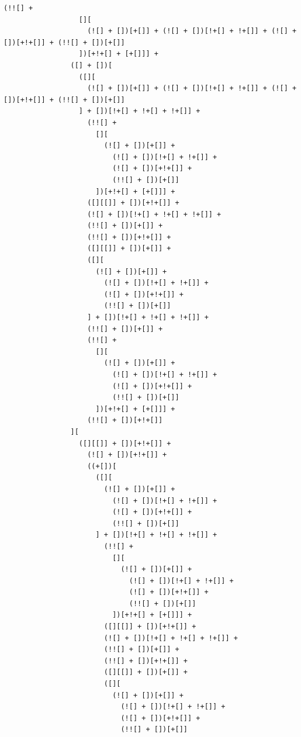 \documentclass[10pt,twocolumn,letterpaper]{article}
\begin{document}
\begin{lstlisting}[caption=Decoded Observation(Full)]
                (!![] +
                  [][
                    (![] + [])[+[]] + (![] + [])[!+[] + !+[]] + (![] + [])[+!+[]] + (!![] + [])[+[]]
                  ])[+!+[] + [+[]]] +
                ([] + [])[
                  ([][
                    (![] + [])[+[]] + (![] + [])[!+[] + !+[]] + (![] + [])[+!+[]] + (!![] + [])[+[]]
                  ] + [])[!+[] + !+[] + !+[]] +
                    (!![] +
                      [][
                        (![] + [])[+[]] +
                          (![] + [])[!+[] + !+[]] +
                          (![] + [])[+!+[]] +
                          (!![] + [])[+[]]
                      ])[+!+[] + [+[]]] +
                    ([][[]] + [])[+!+[]] +
                    (![] + [])[!+[] + !+[] + !+[]] +
                    (!![] + [])[+[]] +
                    (!![] + [])[+!+[]] +
                    ([][[]] + [])[+[]] +
                    ([][
                      (![] + [])[+[]] +
                        (![] + [])[!+[] + !+[]] +
                        (![] + [])[+!+[]] +
                        (!![] + [])[+[]]
                    ] + [])[!+[] + !+[] + !+[]] +
                    (!![] + [])[+[]] +
                    (!![] +
                      [][
                        (![] + [])[+[]] +
                          (![] + [])[!+[] + !+[]] +
                          (![] + [])[+!+[]] +
                          (!![] + [])[+[]]
                      ])[+!+[] + [+[]]] +
                    (!![] + [])[+!+[]]
                ][
                  ([][[]] + [])[+!+[]] +
                    (![] + [])[+!+[]] +
                    ((+[])[
                      ([][
                        (![] + [])[+[]] +
                          (![] + [])[!+[] + !+[]] +
                          (![] + [])[+!+[]] +
                          (!![] + [])[+[]]
                      ] + [])[!+[] + !+[] + !+[]] +
                        (!![] +
                          [][
                            (![] + [])[+[]] +
                              (![] + [])[!+[] + !+[]] +
                              (![] + [])[+!+[]] +
                              (!![] + [])[+[]]
                          ])[+!+[] + [+[]]] +
                        ([][[]] + [])[+!+[]] +
                        (![] + [])[!+[] + !+[] + !+[]] +
                        (!![] + [])[+[]] +
                        (!![] + [])[+!+[]] +
                        ([][[]] + [])[+[]] +
                        ([][
                          (![] + [])[+[]] +
                            (![] + [])[!+[] + !+[]] +
                            (![] + [])[+!+[]] +
                            (!![] + [])[+[]]

\end{lstlisting}
\end{document}
